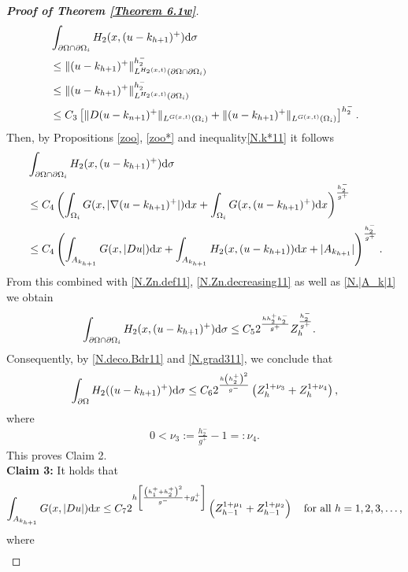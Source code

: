\documentclass[10pt,reqno]{amsart}
\newcommand *\w{^\wedge}
\theoremstyle{definition}
\numberwithin{equation}{section}
\begin{document}
\begin{proof}[\textbf{Proof of Theorem \ref{Theorem 6.1w}}]
	\begin{align*}
		& \int_{\partial\Omega\cap \partial \Omega_{i}}H_2(x,(u-k_{h+1})^+){\rm d} \sigma\\
		& \leq \|(u-k_{h+1})^+\|_{L^{H_2(x,t)}(\partial\Omega\cap \partial \Omega_{i})}^{h_2^-}\\
        & \leq \|(u-k_{h+1})^+\|_{L^{H_2(x,t)}( \partial \Omega_{i})}^{h_2^-}\\
		&\leq C_3\left[\|D (u-k_{n+1})^+\|_{L^{G(x,t)}(\Omega_{i})}+\|(u-k_{h+1})^+\|_{L^{G(x,t)}(\Omega_{i})}\right]^{h_2^-}.
	\end{align*}
	Then, by Propositions \ref{zoo}, \ref{zoo*} and inequality\eqref{N.k*11} it follows
	\begin{align*}
		& \int_{\partial\Omega\cap \partial \Omega_{i}}H_2(x,(u-k_{h+1})^+){\rm d} \sigma\\
		&\leq C_4\left(\int_{\Omega_{i}}G(x,|\nabla (u-k_{h+1})^+|){\rm d}x+\int_{\Omega_{i}}G(x,(u-k_{h+1})^+){\rm d}x\right)^{\frac{h_2^-}{g^+}}\\
	\notag&\leq C_4\left(\int_{A_{k_{h+1}}}G(x,|D u|){\rm d}x+\int_{A_{k_{h+1}}}H_2(x,(u-k_{h+1})){\rm d}x+|A_{k_{h+1}}|\right)^{\frac{h_2^-}{g^+}}.
	\end{align*}
	From this combined with \eqref{N.Zn.def11}, \eqref{N.Zn.decreasing11} as well as \eqref{N.|A_k|1} we obtain
	\begin{align}\label{N.grad311}
		\int_{\partial\Omega\cap \partial \Omega_{i}}H_2(x,(u-k_{h+1})^+){\rm d} \sigma&\leq C_52^{\frac{hh_2^+h_2^-}{g^+}}Z_{h}^{\frac{h_2^-}{g^+}}.
	\end{align}
Consequently, by \eqref{N.deco.Bdr11} and \eqref{N.grad311}, we conclude that
	\begin{equation*}
		\int_{\partial\Omega}H_2((u-k_{h+1})^+){\rm d}\sigma\leq C_62^{\frac{h\left(h_2^+\right)^2}{g^-}}\left(Z_{h}^{1+\nu_3}+Z_{h}^{1+\nu_4}\right),
	\end{equation*}
	where
	\begin{align*}
		0<\nu_3:=\frac{h_2^-}{g^+}-1=:\nu_4.
	\end{align*}
 This proves Claim 2.\\	
	{\bf Claim 3:} It hol{\rm d}s that
	\begin{equation*}
		\int_{A_{k_{h+1}}}G(x,|D u|){\rm d}x\leq  C_7 2^{h\left[\frac{\left(h_1^++h_2^+\right)^2}{g^-}+g_*^+\right]}\left(Z_{h-1}^{1+\mu_1}+Z_{h-1}^{1+\mu_2}\right)\quad \text{for all }h=1,2,3,\ldots,
	\end{equation*}
	where
	\begin{align*}

\end{align*}
\end{proof}
\end{document}
